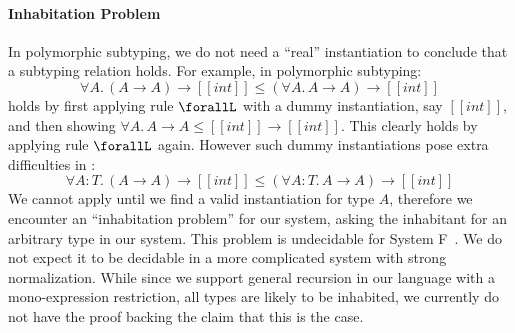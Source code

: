 \paragraph{Inhabitation Problem}

In polymorphic subtyping, we do not need a ``real'' instantiation to conclude
that a subtyping relation holds. For example, in polymorphic subtyping:
\begin{equation*}
    \forall A.\, (A \rightarrow A) \rightarrow [[int]] \le (\forall A.\, A \rightarrow A) \rightarrow [[int]]
\end{equation*}
\noindent holds by first applying rule $\forallL$ with a dummy instantiation,
say $[[int]]$, and then showing $\forall A.\, A \rightarrow A \le [[int]] \rightarrow [[int]]$.
This clearly holds by applying rule $\forallL$ again. However such dummy instantiations
pose extra difficulties in \name:
\begin{equation*}
    \forall A : T.\, (A \rightarrow A) \rightarrow [[int]] \le (\forall A : T.\, A \rightarrow A) \rightarrow [[int]]
\end{equation*}
We cannot apply  until we find a valid instantiation for type $A$,
therefore we encounter an ``inhabitation problem'' for our system, asking the
inhabitant for an arbitrary type in our system. This problem is
undecidable for System F~\cite{dudenhefner2019simpler}. We do not expect it to be
decidable in a more complicated system with strong normalization.
While since we support general recursion in our language with a mono-expression
restriction, all types are
likely to be inhabited, we currently do not have the proof backing the claim that
this is the case.
